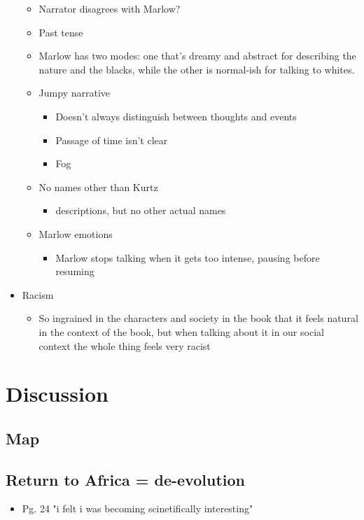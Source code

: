 \documentclass[letterpaper]{article}
\begin{document}
\begin{itemize}
\begin{itemize}
\item Narrator disagrees with Marlow?
\item Past tense
\item Marlow has two modes: one that's dreamy and abstract for describing
the nature and the blacks, while the other is normal-ish for talking
to whites.
\item Jumpy narrative

\begin{itemize}
\item Doesn't always distinguish between thoughts and events
\item Passage of time isn't clear
\item Fog
\end{itemize}

\item No names other than Kurtz

\begin{itemize}
\item descriptions, but no other actual names
\end{itemize}

\item Marlow emotions

\begin{itemize}
\item Marlow stops talking when it gets too intense, pausing before
resuming
\end{itemize}
\end{itemize}

\item Racism

\begin{itemize}
\item So ingrained in the characters and society in the book that it feels
natural in the context of the book, but when talking about it in our
social context the whole thing feels very racist
\end{itemize}
\end{itemize}

\section{Discussion}
\label{sec:org6539eb8}
\subsection{Map}
\label{sec:orgb160fd5}
\subsection{Return to Africa = de-evolution}
\label{sec:orge0f4b85}
\begin{itemize}
\item Pg. 24 "i felt i was becoming scinetifically interesting"
\end{itemize}
\end{document}
